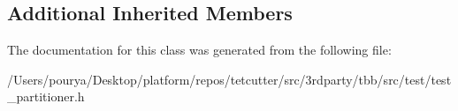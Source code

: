 \subsection*{Additional Inherited Members}


The documentation for this class was generated from the following file\+:\begin{DoxyCompactItemize}
\item 
/\+Users/pourya/\+Desktop/platform/repos/tetcutter/src/3rdparty/tbb/src/test/test\+\_\+partitioner.\+h\end{DoxyCompactItemize}
